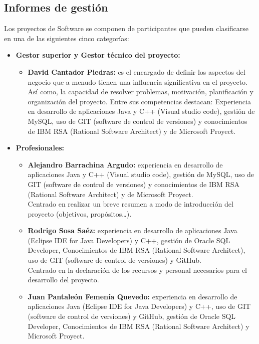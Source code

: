 \subsection{Informes de gestión}
Los proyectos de Software se componen de participantes que pueden clasificarse en una de las siguientes cinco categorías:

\begin{itemize}
	\item\textbf{Gestor superior y Gestor técnico del proyecto:}
	      \begin{itemize}
		      \item\textbf{David Cantador Piedras: }es el encargado de definir los aspectos del negocio que a menudo tienen una influencia significativa en el proyecto. Así como, la capacidad de resolver problemas, motivación, planificación y organización del proyecto. Entre sus competencias destacan: Experiencia en desarrollo de aplicaciones Java y C++ (Visual studio code), gestión de MySQL, uso de GIT (software de control de versiones) y conocimientos de IBM RSA (Rational Software Architect) y de Microsoft Proyect.
	      \end{itemize}
	\item\textbf{Profesionales:}
	      \begin{itemize}
		      \item\textbf{Alejandro Barrachina Argudo:} experiencia en desarrollo de aplicaciones Java y C++ (Visual studio code), gestión de MySQL, uso de GIT (software de control de versiones) y conocimientos de IBM RSA (Rational Software Architect) y de Microsoft Proyect.\\
		            Centrado en realizar un breve resumen a modo de introducción del proyecto (objetivos, propósitos…).
		      \item\textbf{Rodrigo Sosa Saéz:} experiencia en desarrollo de aplicaciones Java (Eclipse IDE for Java Developers) y C++, gestión de Oracle SQL Developer, Conocimientos de IBM RSA (Rational Software Architect), uso de GIT (software de control de versiones) y GitHub. \\
		            Centrado en la declaración de los recursos y personal necesarios para el desarrollo del proyecto.
		      \item\textbf{Juan Pantaleón Femenía Quevedo:} experiencia en desarrollo de aplicaciones Java (Eclipse IDE for Java Developers) y C++, uso de GIT (software de control de versiones) y GitHub, gestión de Oracle SQL Developer, Conocimientos de IBM RSA (Rational Software Architect) y Microsoft Proyect.\\

\end{itemize}
\end{itemize}
